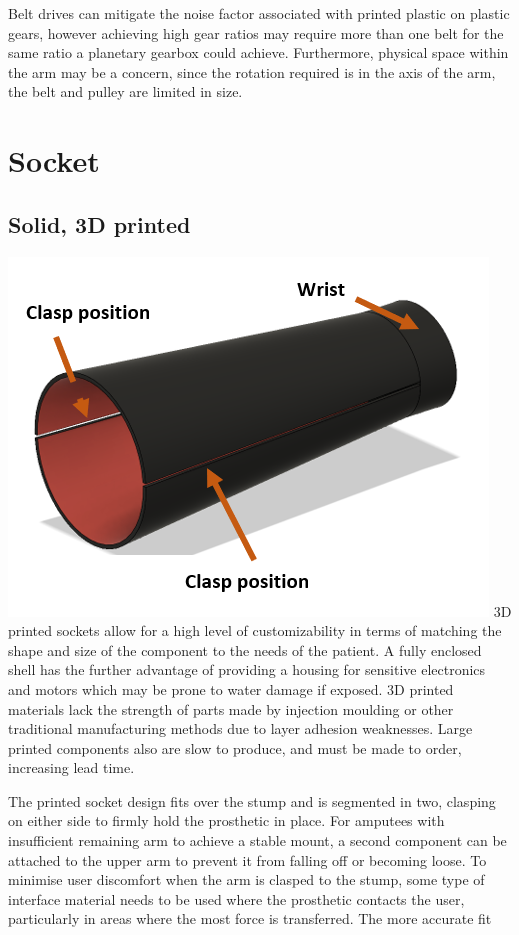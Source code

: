 \documentclass[11pt,3p]{report}
\begin{document}
\begin{multicols}{2}
\begin{enumerate}[noitemsep]
{Belt drives can mitigate the noise factor associated with printed plastic on plastic gears, however achieving high gear ratios may require more than one belt for the same ratio a planetary gearbox could achieve. Furthermore, physical space within the arm may be a concern, since the rotation required is in the axis of the arm, the belt and pulley are limited in size.
			}	
			\end{enumerate}


	
	
	\section{Socket}
		
		\subsection{Solid, 3D printed}
		
		\includegraphics[scale=0.7]{print_socket.PNG}
		3D printed sockets allow for a high level of customizability in terms of matching the shape and size of the component to the needs of the patient. A fully enclosed shell has the further advantage of providing a housing for sensitive electronics and motors which may be prone to water damage if exposed. 3D printed materials lack the strength of parts made by injection moulding or other traditional manufacturing methods due to layer adhesion weaknesses. Large printed components also are slow to produce, and must be made to order, increasing lead time.
		
		The printed socket design fits over the stump and is segmented in two, clasping on either side to firmly hold the prosthetic in place. For amputees with insufficient remaining arm to achieve a stable mount, a second component can be attached to the upper arm to prevent it from falling off or becoming loose. To minimise user discomfort when the arm is clasped to the stump, some type of interface material needs to be used where the prosthetic contacts the user, particularly in areas where the most force is transferred. The more accurate fit 


\end{multicols}
\end{document}
